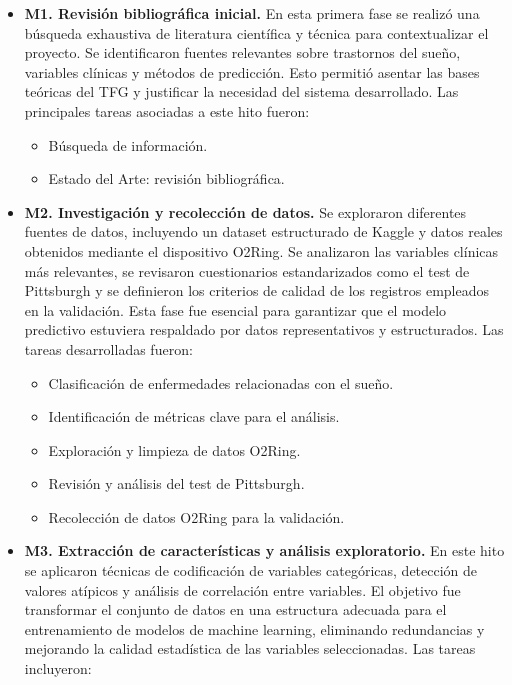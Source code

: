 \begin{itemize}
  \item \textbf{M1. Revisión bibliográfica inicial.}
  En esta primera fase se realizó una búsqueda exhaustiva de literatura científica y técnica para contextualizar el proyecto. Se identificaron fuentes relevantes sobre trastornos del sueño, variables clínicas y métodos de predicción. Esto permitió asentar las bases teóricas del TFG y justificar la necesidad del sistema desarrollado. 
  Las principales tareas asociadas a este hito fueron:
  
  \begin{itemize}
    \item Búsqueda de información.
    \item Estado del Arte: revisión bibliográfica.
  \end{itemize}

  \item \textbf{M2. Investigación y recolección de datos.}
  Se exploraron diferentes fuentes de datos, incluyendo un dataset estructurado de Kaggle y datos reales obtenidos mediante el dispositivo O2Ring. Se analizaron las variables clínicas más relevantes, se revisaron cuestionarios estandarizados como el test de Pittsburgh y se definieron los criterios de calidad de los registros empleados en la validación. Esta fase fue esencial para garantizar que el modelo predictivo estuviera respaldado por datos representativos y estructurados.
  Las tareas desarrolladas fueron:
  
  \begin{itemize}
    \item Clasificación de enfermedades relacionadas con el sueño.
    \item Identificación de métricas clave para el análisis.
    \item Exploración y limpieza de datos O2Ring.
    \item Revisión y análisis del test de Pittsburgh.
    \item Recolección de datos O2Ring para la validación.
  \end{itemize}

  \item \textbf{M3. Extracción de características y análisis exploratorio.}
  En este hito se aplicaron técnicas de codificación de variables categóricas, detección de valores atípicos y análisis de correlación entre variables. El objetivo fue transformar el conjunto de datos en una estructura adecuada para el entrenamiento de modelos de machine learning, eliminando redundancias y mejorando la calidad estadística de las variables seleccionadas.
  Las tareas incluyeron:


\end{itemize}
